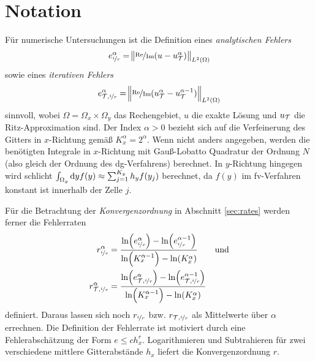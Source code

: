 \section{Notation}\label{sec:notation_4}
Für numerische Untersuchungen ist die Definition eines \emph{analytischen Fehlers} 
\begin{equation}
  e_{\nicefrac{i}{r}}^{\alpha} = \norm{\nicefrac{\operatorname{Re}}{\operatorname{Im}} (u - u_{\mathcal{T}}^{\alpha})}_{L^2(\Omega)}
  \label{eq:error_ana}
\end{equation}
sowie eines \emph{iterativen Fehlers}
\begin{equation*}
  e_{\mathcal{T}, \nicefrac{i}{r}}^{\alpha} = \norm{\nicefrac{\operatorname{Re}}{\operatorname{Im}} (u_{\mathcal{T}}^{\alpha} - u_{\mathcal{T}}^{\alpha-1})}_{L^2(\Omega)}
\end{equation*}
sinnvoll, wobei $\Omega=\Omega_x \times \Omega_y$ das Rechengebiet, $u$ die exakte Lösung und $u_{\mathcal{T}}$ die Ritz-Approximation sind. Der Index $\alpha>0$ bezieht sich auf die Verfeinerung des Gitters in $x$-Richtung gemäß $K_x^{\alpha} = 2^\alpha$. Wenn nicht anders angegeben, werden die benötigten Integrale in $x$-Richtung mit Gauß-Lobatto Quadratur der Ordnung $N$ (also gleich der Ordnung des \ac{dg}-Verfahrens) berechnet.
In $y$-Richtung hingegen wird schlicht $\int_{\Omega_y}\mathop{}\!\mathrm{d} y f(y) \approx \sum_{j=1}^{K_y} h_y f(y_j)$ berechnet, da $f(y)$ im \ac{fv}-Verfahren konstant ist innerhalb der Zelle $j$.

Für die Betrachtung der \emph{Konvergenzordnung} in Abschnitt \ref{sec:rates} werden ferner die Fehlerraten
\begin{equation}
  \begin{aligned}
    r_{\nicefrac{i}{r}}^{\alpha} &= \frac{\ln(e_{\nicefrac{i}{r}}^{\alpha}) - \ln(e_{\nicefrac{i}{r}}^{\alpha-1})}{\ln(K_x^{\alpha-1}) - \ln(K_x^{\alpha})} \qquad\text{und}\\
    r_{\mathcal{T},\nicefrac{i}{r}}^{\alpha} &= \frac{\ln(e_{\mathcal{T},\nicefrac{i}{r}}^{\alpha}) - \ln(e_{\mathcal{T},\nicefrac{i}{r}}^{\alpha-1})}{\ln(K_x^{\alpha-1}) - \ln(K_x^{\alpha})}
  \end{aligned}
  \label{eq:fehlerraten}
\end{equation}
definiert. Daraus lassen sich noch $r_{\nicefrac{i}{r}}$ bzw. $r_{\mathcal{T},\nicefrac{i}{r}}$ als Mittelwerte über $\alpha$ errechnen. Die Definition der Fehlerrate ist motiviert durch eine Fehlerabschätzung der Form $e \leq ch_x^r$. Logarithmieren und Subtrahieren für zwei verschiedene mittlere Gitterabstände $h_x$ liefert die Konvergenzordnung $r$.

